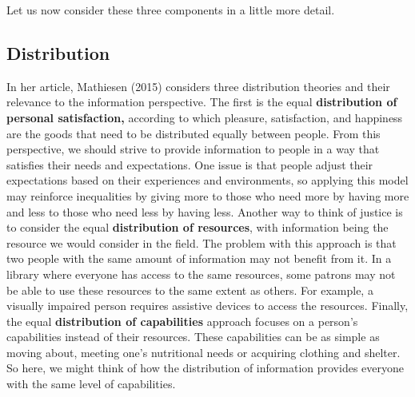 \documentclass[
  letterpaper,
  DIV=11,
  numbers=noendperiod]{scrreprt}
\begin{document}
Let us now consider these three components in a little more detail.

\subsection{Distribution}\label{distribution}

In her article, Mathiesen (2015) considers three distribution theories
and their relevance to the information perspective. The first is the
equal \textbf{distribution of personal satisfaction,} according to which
pleasure, satisfaction, and happiness are the goods that need to be
distributed equally between people. From this perspective, we should
strive to provide information to people in a way that satisfies their
needs and expectations. One issue is that people adjust their
expectations based on their experiences and environments, so applying
this model may reinforce inequalities by giving more to those who need
more by having more and less to those who need less by having less.
Another way to think of justice is to consider the equal
\textbf{distribution of resources}, with information being the resource
we would consider in the field. The problem with this approach is that
two people with the same amount of information may not benefit from it.
In a library where everyone has access to the same resources, some
patrons may not be able to use these resources to the same extent as
others. For example, a visually impaired person requires assistive
devices to access the resources. Finally, the equal \textbf{distribution
of capabilities} approach focuses on a person's capabilities instead of
their resources. These capabilities can be as simple as moving about,
meeting one's nutritional needs or acquiring clothing and shelter. So
here, we might think of how the distribution of information provides
everyone with the same level of capabilities.
\end{document}
